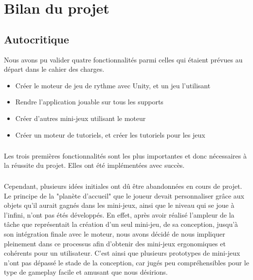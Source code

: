 \chapter{Bilan du projet}

\section{Autocritique}
Nous avons pu valider quatre fonctionnalités parmi celles qui étaient prévues au départ dans le cahier des charges.
\begin{itemize}
\item Créer le moteur de jeu de rythme avec Unity, et un jeu l'utilisant
\item Rendre l'application jouable sur tous les supports
\item Créer d'autres mini-jeux utilisant le moteur
\item Créer un moteur de tutoriels, et créer les tutoriels pour les jeux
\end{itemize}

\paragraph{}
Les trois premières fonctionnalités sont les plus importantes et donc nécessaires à la réussite du projet. Elles ont été implémentées avec succès.

\paragraph{}
Cependant, plusieurs idées initiales ont dû être abandonnées en cours de projet. Le principe de la "planète d'accueil" que le joueur devait personnaliser grâce aux objets qu'il aurait gagnés dans les mini-jeux, ainsi que le niveau qui se joue à l'infini, n'ont pas étés développés. En effet, après avoir réalisé l'ampleur de la tâche que représentait la création d'un seul mini-jeu, de sa conception, jusqu'à son intégration finale avec le moteur, nous avons décidé de nous impliquer pleinement dans ce processus afin d'obtenir des mini-jeux ergonomiques et cohérents pour un utilisateur. C'est ainsi que plusieurs prototypes de mini-jeux n'ont pas dépassé le stade de la conception, car jugés peu compréhensibles pour le type de gameplay facile et amusant que nous désirions.

